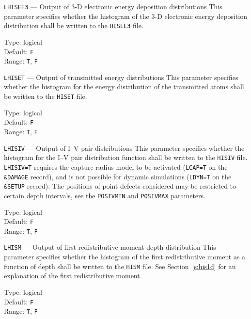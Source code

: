 \begin{keydescription}{\texttt{LHISEE3} --- Output of 3-D electronic energy deposition distributions}
%
  This parameter specifies whether the histogram of the 3-D electronic energy
  deposition distribution shall be written to the \texttt{HISEE3} file.
  \begin{keytab}
    Type:    \> logical \\
    Default: \> \texttt{F} \\
    Range:   \> \texttt{T}, \texttt{F} 
  \end{keytab}
\end{keydescription}

\begin{keydescription}{\texttt{LHISET} --- Output of transmitted energy distributions}
%
  This parameter specifies whether the histogram for the energy distribution of the 
  transmitted atoms shall be written to the \texttt{HISET} file.
  \begin{keytab}
    Type:    \> logical \\
    Default: \> \texttt{F} \\
    Range:   \> \texttt{T}, \texttt{F} 
  \end{keytab}
\end{keydescription}

\begin{keydescription}{\texttt{LHISIV} --- Output of I--V pair distributions}
%
  This parameter specifies whether the histogram for the I--V pair distribution function shall 
  be written to the \texttt{HISIV} file. \texttt{LHISIV=T} requires the capture radius model to 
  be activated (\texttt{LCAP=T} on the \texttt{\&DAMAGE} record), and is not possible for 
  dynamic simulations (\texttt{LDYN=T} on the \texttt{\&SETUP} record). The positions of point 
  defects considered may be restricted to certain depth intervals, see the
  \texttt{POSIVMIN} and \texttt{POSIVMAX} parameters.
  \begin{keytab}
    Type:    \> logical \\
    Default: \> \texttt{F} \\
    Range:   \> \texttt{T}, \texttt{F} 
  \end{keytab}
\end{keydescription}

\begin{keydescription}{\texttt{LHISM} --- Output of first redistributive moment depth
    distribution}
%
  This parameter specifies whether the histogram of the first redistributive moment as a 
  function of depth shall be written to the \texttt{HISM} file. See Section~\ref{s:his1d} for 
  an explanation of the first redistributive moment. 
  \begin{keytab}
    Type:    \> logical \\
    Default: \> \texttt{F} \\
    Range:   \> \texttt{T}, \texttt{F} 
  \end{keytab}
\end{keydescription}


